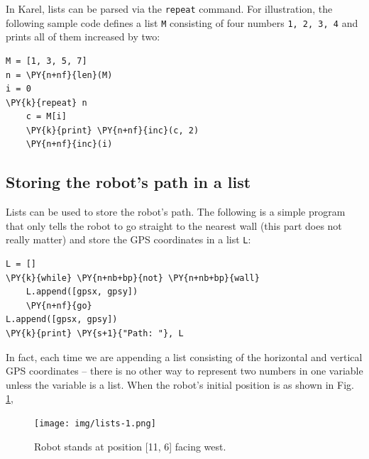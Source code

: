 In Karel, lists can be parsed via the {\tt repeat} command.
For illustration, the following sample code defines a list {\tt M} consisting of four numbers 
{\tt 1, 2, 3, 4} and prints all of them increased by two: \\

\begin{bbox}
\begin{Verbatim}[commandchars=\\\{\}]
M = [1, 3, 5, 7]
n = \PY{n+nf}{len}(M)
i = 0
\PY{k}{repeat} n
    c = M[i]
    \PY{k}{print} \PY{n+nf}{inc}(c, 2)
    \PY{n+nf}{inc}(i)
\end{Verbatim}
\end{bbox}
\vspace{6mm}

\subsection[\ \ Storing the robot's path in a list]{Storing the robot's path in a list}

\noindent
Lists can be used to store the robot's path. The following 
is a simple program that only tells the robot to go straight to the 
nearest wall (this part does not really matter) and store the GPS
coordinates in a list {\tt L}:\\

\begin{bbox}
\begin{Verbatim}[commandchars=\\\{\}]
L = []
\PY{k}{while} \PY{n+nb+bp}{not} \PY{n+nb+bp}{wall}
    L.append([gpsx, gpsy])
    \PY{n+nf}{go}
L.append([gpsx, gpsy])
\PY{k}{print} \PY{s+1}{"Path: "}, L
\end{Verbatim}
\end{bbox}
\vspace{6mm}

\noindent
In fact, each time we are appending a list consisting of the horizontal and 
vertical GPS coordinates -- there is no other way to represent two numbers 
in one variable unless the variable is a list. When the robot's initial position 
is as shown in Fig. \ref{fig:list-1},
\newpage

\begin{figure}[!ht]
\begin{center}
\texttt{[image: img/lists-1.png]}
\vspace{-0mm}
\caption{Robot stands at position [11, 6] facing west.}
\label{fig:list-1}
\end{center}
\end{figure}

